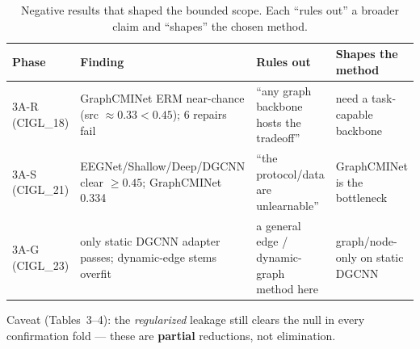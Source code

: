 \begin{table}[t]
\centering
\caption{Negative results that shaped the bounded scope. Each ``rules out'' a broader claim and ``shapes''
the chosen method.}
\label{tab:negative_results}
\small
\begin{tabular}{p{2.0cm}p{4.6cm}p{3.0cm}p{3.0cm}}
\toprule
Phase & Finding & Rules out & Shapes the method \\
\midrule
3A-R (CIGL\_18) & GraphCMINet ERM near-chance (src $\approx 0.33 < 0.45$); 6 repairs fail & ``any graph backbone hosts the tradeoff'' & need a task-capable backbone \\
3A-S (CIGL\_21) & EEGNet/Shallow/Deep/DGCNN clear $\ge 0.45$; GraphCMINet 0.334 & ``the protocol/data are unlearnable'' & GraphCMINet is the bottleneck \\
3A-G (CIGL\_23) & only static DGCNN adapter passes; dynamic-edge stems overfit & a general edge / dynamic-graph method here & graph/node-only on static DGCNN \\
\bottomrule
\end{tabular}

\vspace{2pt}
\footnotesize Caveat (Tables~3--4): the \emph{regularized} leakage still clears the null in every
confirmation fold --- these are \textbf{partial} reductions, not elimination.
\end{table}
